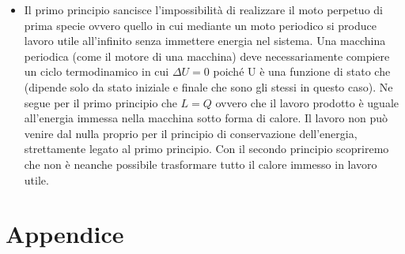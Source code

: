 \documentclass[10pt,a4paper]{article}
\begin{document}
\begin{itemize}
\item Il primo principio sancisce l'impossibilità di realizzare il moto perpetuo di prima specie ovvero quello in cui mediante un moto periodico si produce lavoro utile all'infinito senza immettere energia nel sistema. Una macchina periodica (come il motore di una macchina) deve necessariamente compiere un ciclo termodinamico in cui $\Delta U = 0$ poiché U è una funzione di stato che (dipende solo da stato iniziale e finale che sono gli stessi in questo caso). Ne segue per il primo principio che $L = Q$ ovvero che il lavoro prodotto è uguale all'energia immessa nella macchina sotto forma di calore. Il lavoro non può venire dal nulla proprio per il principio di conservazione dell'energia, strettamente legato al primo principio. Con il secondo principio scopriremo che non è neanche possibile trasformare tutto il calore immesso in lavoro utile. 
\end{itemize} 

\section*{Appendice} 
\end{document}
